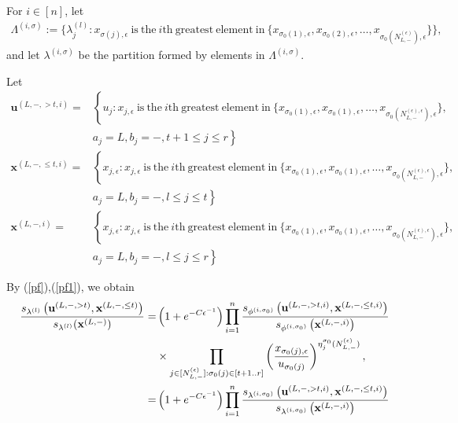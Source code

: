 \documentclass[11pt]{amsart}
\theoremstyle{plain}
\theoremstyle{definition}
\theoremstyle{remark}
\newcommand\si{\sigma}
\numberwithin{equation}{section}
\numberwithin{theorem}{section}
\numberwithin{figure}{section}
\begin{document}
For $i\in[n]$, let
\begin{align*}
\Lambda^{(i,\si)}:=\{\lambda_j^{(l)}:x_{\si(j),\epsilon}\ \mathrm{is\ the\ }i\mathrm{th\ greatest\ element\ in\ }\{x_{\si_0(1),\epsilon},x_{\si_0(2),\epsilon},\ldots,x_{\si_0(N_{L,-}^{(\epsilon)}),\epsilon}\}\},
\end{align*}
and let $\lambda^{(i,\sigma)}$ be the partition formed by elements in $\Lambda^{(i,\si)}$.

Let
\begin{align*}
\mathbf{u}^{(L,-,>t,i)}=&\left\{u_j:x_{j,\epsilon}\ \mathrm{is\ the\ }i\mathrm{th\ greatest\ element\ in\ } \{x_{\si_0(1),\epsilon},x_{\si_0(1),\epsilon},\ldots,x_{\si_0(N_{L,-}^{(\epsilon),\epsilon}),\epsilon}\},\right.\\
&\left.a_j=L,b_j=-,t+1\leq j\leq r\right\}\\
\mathbf{x}^{(L,-,\leq t,i)}=&\left\{x_{j,\epsilon}:x_{j,\epsilon}\ \mathrm{is\ the\ }i\mathrm{th\ greatest\ element\ in\ } \{x_{\si_0(1),\epsilon},x_{\si_0(1),\epsilon},\ldots,x_{\si_0(N_{L,-}^{(\epsilon),\epsilon}),\epsilon}\},\right.\\
&\left.a_j=L,b_j=-,l\leq j\leq t\right\}\\
\mathbf{x}^{(L,-,i)}=&\left\{x_{j,\epsilon}:x_{j,\epsilon}\ \mathrm{is\ the\ }i\mathrm{th\ greatest\ element\ in\ } \{x_{\si_0(1),\epsilon},x_{\si_0(1),\epsilon},\ldots,x_{\si_0(N_{L,-}^{(\epsilon),\epsilon}),\epsilon}\},\right.\\
&\left.a_j=L,b_j=-,l\leq j\leq r\right\}
\end{align*}

By (\ref{pf}),(\ref{pf1}), we obtain
\begin{align*}
\frac{s_{\lambda^{(l)}}\left(\mathbf{u}^{(L,-,> t)},\mathbf{x}^{(L,-,\leq t)}\right)}{s_{\lambda^{(l)}}(\mathbf{x}^{(L,-)})}
=&\left(1+e^{-C\epsilon^{-1}}\right)
\prod_{i=1}^{n}
\frac{s_{\phi^{(i,\sigma_0)}}\left(\mathbf{u}^{(L,-,>t,i)},\mathbf{x}^{(L,-,\leq t,i)}\right)}{s_{\phi^{(i,\sigma_0)}}\left(\mathbf{x}^{(L,-,i)}\right)}\\
&\times\prod_{j\in[N_{L,-}^{(\epsilon)}]:\sigma_0(j)\in[t+1..r]}\left(\frac{x_{\si_0(j),\epsilon}}{u_{\si_0(j)}}\right)^{\eta_j^{\si_0}(N_{L,-}^{(\epsilon)})}\notag,\\
=&\left(1+e^{-C\epsilon^{-1}}\right)
\prod_{i=1}^{n}
\frac{s_{\lambda^{(i,\sigma_0)}}\left(\mathbf{u}^{(L,-,>t,i)},\mathbf{x}^{(L,-,\leq t,i)}\right)}{s_{\lambda^{(i,\sigma_0)}}\left(\mathbf{x}^{(L,-,i)}\right)}
\end{align*}
\end{document}
